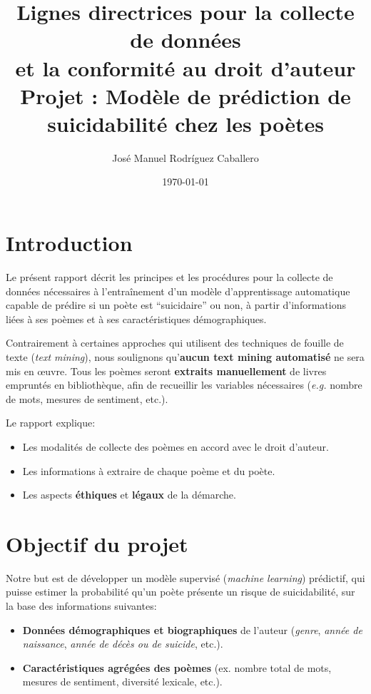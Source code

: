 \documentclass[12pt,a4paper]{article}
\title{Lignes directrices pour la collecte de données\\
et la conformité au droit d'auteur\\
\large{Projet : Modèle de prédiction de suicidabilité chez les poètes}}
\author{José Manuel Rodríguez Caballero}
\date{\today}
\begin{document}
\maketitle
\onehalfspacing

\section{Introduction}

Le présent rapport décrit les principes et les procédures pour la collecte de 
données nécessaires à l'entraînement d'un modèle d'apprentissage automatique 
capable de prédire si un poète est ``suicidaire'' ou non, à partir d'informations 
liées à ses poèmes et à ses caractéristiques démographiques. 

Contrairement à certaines approches qui utilisent des techniques de fouille de texte 
(\textit{text mining}), nous soulignons qu'\textbf{aucun text mining automatisé} 
ne sera mis en \oe uvre. Tous les poèmes seront \textbf{extraits manuellement} de 
livres empruntés en bibliothèque, afin de recueillir les variables nécessaires 
(\textit{e.g.} nombre de mots, mesures de sentiment, etc.). 

Le rapport explique:
\begin{itemize}
    \item Les modalités de collecte des poèmes en accord avec le droit d'auteur.
    \item Les informations à extraire de chaque poème et du poète.
    \item Les aspects \textbf{éthiques} et \textbf{légaux} de la démarche.
\end{itemize}

\section{Objectif du projet}

Notre but est de développer un modèle supervisé (\textit{machine learning}) 
prédictif, qui puisse estimer la probabilité qu'un poète présente un risque de 
suicidabilité, sur la base des informations suivantes:
\begin{itemize}
    \item \textbf{Données démographiques et biographiques} de l'auteur 
    (\textit{genre}, \textit{année de naissance}, \textit{année de décès ou 
    de suicide}, etc.).
    \item \textbf{Caractéristiques agrégées des poèmes} (ex. nombre total 
    de mots, mesures de sentiment, diversité lexicale, etc.).
\end{itemize}
\end{document}
